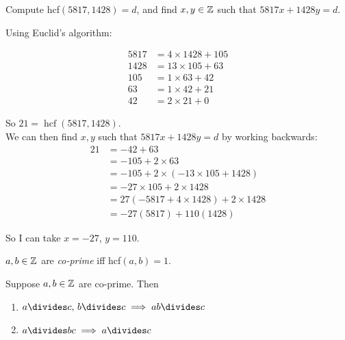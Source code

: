 \documentclass[10pt]{scrartcl}
\DeclareMathOperator{\hcf}{hcf}
\begin{document}
\begin{example}  
Compute hcf$(5817, 1428) = d$, and find $x,y\in\mathbb{Z}$ such that $5817 x + 1428 y = d$. 	

Using Euclid's algorithm: 

\[
\begin{aligned}
  5817 &= 4 \times 1428 + 105\\
  1428 &= 13 \times 105 + 63\\
  105 &= 1 \times 63 + 42\\
  63 &= 1 \times 42 + 21\\
  42 &= 2 \times 21 + 0
\end{aligned}
\]

So $21 = \hcf(5817,1428)$.\\ 


We can then find $x,y$ such that $5817x + 1428y = d$ by working backwards:
\[
\begin{aligned}
  21 &= -42 + 63\\
  &= -105 + 2\times 63\\
  &= -105 + 2 \times(-13 \times 105 + 1428)\\
  &= -27 \times 105 + 2 \times 1428\\
  &= 27 (-5817 + 4\times 1428) + 2\times 1428\\
  &= -27(5817) + 110(1428)
\end{aligned}
\]

So I can take $x = -27$, $y = 110.$
\end{example}\vspace*{5pt}

\begin{definition}
$a,b \in\mathbb{Z}$ are \emph{co-prime} iff hcf$(a,b) = 1$. 	
\end{definition}\vspace*{5pt}

\begin{proposition}
Suppose $a,b \in\mathbb{Z}$ are co-prime. Then
\begin{enumerate}
\item $a\divides c,\, b \divides c \implies ab \divides c$
\item $a \divides bc \implies a \divides c$	
\end{enumerate}
\end{proposition}
\end{document}
